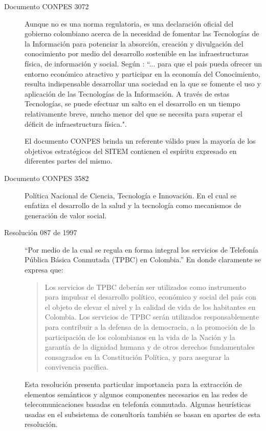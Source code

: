 \begin{description}
\item[Documento CONPES 3072] Aunque no es una norma regulatoria, es una declaración oficial del gobierno colombiano acerca de la necesidad de fomentar las Tecnologías de la Información para potenciar la absorción, creación y divulgación del conocimiento por medio del desarrollo sostenible en las infraestructuras física, de información y social. Según \cite{mincomunicaciones3072}:  “... para que el país pueda ofrecer un entorno económico atractivo y participar en la economía del Conocimiento, resulta indispensable desarrollar una sociedad en la que se fomente el uso y aplicación de las Tecnologías de la Información. A través de estas Tecnologías, se puede efectuar un salto en el desarrollo en un tiempo relativamente breve, mucho menor del que se necesita para superar el déficit de infraestructura física.".

El documento CONPES brinda un referente válido pues la mayoría de los objetivos estratégicos del SITEM contienen el espíritu expresado en diferentes partes del mismo.

\item[Documento CONPES 3582] Política Nacional de Ciencia, Tecnología e Innovación. En el cual se enfatiza el desarrollo de la salud y la tecnología como mecanismos de generación de valor social.

\item[Resolución 087 de 1997] “Por medio de la cual se regula en forma integral los servicios de Telefonía Pública Básica Conmutada (TPBC) en Colombia.” En donde claramente se expresa que: \begin{quote}
Los servicios de TPBC deberán ser utilizados como instrumento para impulsar el desarrollo político, económico y social del país con el objeto de elevar el nivel y la calidad de vida de los habitantes en Colombia. Los servicios de TPBC serán utilizados responsablemente para contribuir a la defensa de la democracia, a la promoción de la participación de los colombianos en la vida de la Nación y la garantía de la dignidad humana y de otros derechos fundamentales consagrados en la Constitución Política, y para asegurar la convivencia pacífica.\end{quote} 

Esta resolución presenta particular importancia para la extracción de elementos semánticos y algunos componentes necesarios en las redes de telecomunicaciones basadas en telefonía conmutada. Algunas heurísticas usadas en el subsistema de consultoría también se basan en apartes de esta resolución.


\end{description}
